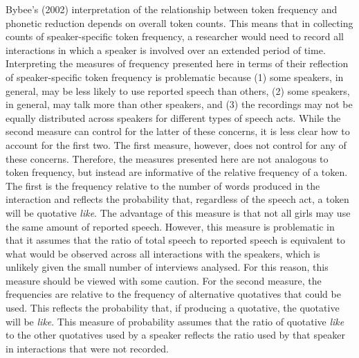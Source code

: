 Bybee's (2002) interpretation of the relationship between token frequency and phonetic reduction depends on overall token counts.  This means that in collecting counts of speaker-specific token frequency, a researcher would need to record all interactions in which a speaker is involved over an extended period of time.  Interpreting the measures of frequency presented here in terms of their reflection of speaker-specific token frequency is problematic because (1) some speakers, in general, may be less likely to use reported speech than others, (2) some speakers, in general, may talk more than other speakers, and (3) the recordings may not be equally distributed across speakers for different types of speech acts.  While the second measure can control for the latter of these concerns, it is less clear how to account for the first two.  The first measure, however, does not control for any of these concerns. Therefore, the measures presented here are not analogous to token frequency, but instead are informative of the relative frequency of a token.  The first is the frequency relative to the number of words produced in the interaction and reflects the probability that, regardless of the speech act, a token will be quotative \textit{like}.  The advantage of this measure is that not all girls may use the same amount of reported speech.  However, this measure is problematic in that it assumes that the ratio of total speech to reported speech is equivalent to what would be observed across all interactions with the speakers, which is unlikely given the small number of interviews analysed.  For this reason, this measure should be viewed with some caution.  For the second measure, the frequencies are relative to the frequency of alternative quotatives that could be used.  This reflects the probability that, if producing a quotative, the quotative will be \textit{like}.  This measure of probability assumes that the ratio of quotative \textit{like} to the other quotatives used by a speaker reflects the ratio used by that speaker in interactions that were not recorded.

\nocite{bybee2002-lvc}

